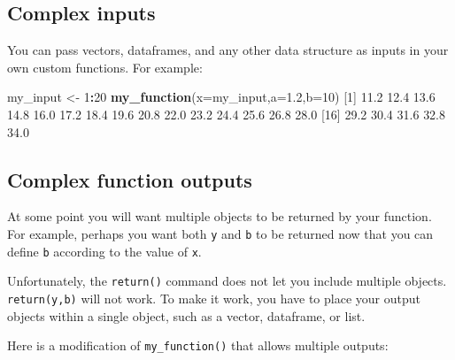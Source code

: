 \documentclass[]{book}
\newenvironment{Shaded}{\begin{snugshade}}{\end{snugshade}}
\newcommand{\DataTypeTok}[1]{\textcolor[rgb]{0.13,0.29,0.53}{#1}}
\newcommand{\DecValTok}[1]{\textcolor[rgb]{0.00,0.00,0.81}{#1}}
\newcommand{\FloatTok}[1]{\textcolor[rgb]{0.00,0.00,0.81}{#1}}
\newcommand{\KeywordTok}[1]{\textcolor[rgb]{0.13,0.29,0.53}{\textbf{#1}}}
\newcommand{\NormalTok}[1]{#1}
\newcommand{\OperatorTok}[1]{\textcolor[rgb]{0.81,0.36,0.00}{\textbf{#1}}}
\newcommand{\StringTok}[1]{\textcolor[rgb]{0.31,0.60,0.02}{#1}}
\begin{document}
\hypertarget{complex-inputs}{%
\subsection*{Complex inputs}\label{complex-inputs}}

You can pass vectors, dataframes, and any other data structure as inputs in your own custom functions. For example:

\begin{Shaded}
\begin{Highlighting}[]
\NormalTok{my_input <-}\StringTok{ }\DecValTok{1}\OperatorTok{:}\DecValTok{20}
\KeywordTok{my_function}\NormalTok{(}\DataTypeTok{x=}\NormalTok{my_input,}\DataTypeTok{a=}\FloatTok{1.2}\NormalTok{,}\DataTypeTok{b=}\DecValTok{10}\NormalTok{)}
\NormalTok{ [}\DecValTok{1}\NormalTok{] }\FloatTok{11.2} \FloatTok{12.4} \FloatTok{13.6} \FloatTok{14.8} \FloatTok{16.0} \FloatTok{17.2} \FloatTok{18.4} \FloatTok{19.6} \FloatTok{20.8} \FloatTok{22.0} \FloatTok{23.2} \FloatTok{24.4} \FloatTok{25.6} \FloatTok{26.8} \FloatTok{28.0}
\NormalTok{[}\DecValTok{16}\NormalTok{] }\FloatTok{29.2} \FloatTok{30.4} \FloatTok{31.6} \FloatTok{32.8} \FloatTok{34.0}
\end{Highlighting}
\end{Shaded}

\hypertarget{complex-function-outputs}{%
\subsection*{Complex function outputs}\label{complex-function-outputs}}

At some point you will want multiple objects to be returned by your function. For example, perhaps you want both \texttt{y} and \texttt{b} to be returned now that you can define \texttt{b} according to the value of \texttt{x}.

Unfortunately, the \texttt{return()} command does not let you include multiple objects. \texttt{return(y,b)} will not work. To make it work, you have to place your output objects within a single object, such as a vector, dataframe, or list.

Here is a modification of \texttt{my\_function()} that allows multiple outputs:
\end{document}
